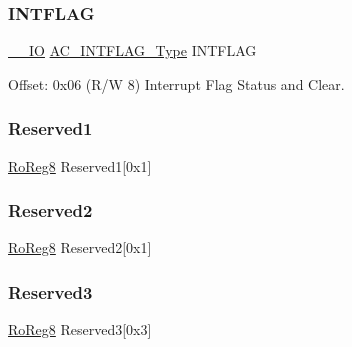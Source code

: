 \subsubsection{\texorpdfstring{INTFLAG}{INTFLAG}}
{\footnotesize\ttfamily \mbox{\hyperlink{core__cm0plus_8h_aec43007d9998a0a0e01faede4133d6be}{\+\_\+\+\_\+\+IO}} \mbox{\hyperlink{union_a_c___i_n_t_f_l_a_g___type}{A\+C\+\_\+\+I\+N\+T\+F\+L\+A\+G\+\_\+\+Type}} I\+N\+T\+F\+L\+AG}



Offset\+: 0x06 (R/W 8) Interrupt Flag Status and Clear. 

\mbox{\label{struct_ac_a092866123ac46d0985136e4dca2f36f4}} 
\subsubsection{\texorpdfstring{Reserved1}{Reserved1}}
{\footnotesize\ttfamily \mbox{\hyperlink{group___s_a_m_d21_e15_a__definitions_ga0d957f1433aaf5d70e4dc2b68288442d}{Ro\+Reg8}} Reserved1\mbox{[}0x1\mbox{]}}

\mbox{\label{struct_ac_a99ee50bfa44e107c16a546d778dcdcc7}} 
\subsubsection{\texorpdfstring{Reserved2}{Reserved2}}
{\footnotesize\ttfamily \mbox{\hyperlink{group___s_a_m_d21_e15_a__definitions_ga0d957f1433aaf5d70e4dc2b68288442d}{Ro\+Reg8}} Reserved2\mbox{[}0x1\mbox{]}}

\mbox{\label{struct_ac_ab22abf5c83fa4a01809facc55e0fda29}} 
\subsubsection{\texorpdfstring{Reserved3}{Reserved3}}
{\footnotesize\ttfamily \mbox{\hyperlink{group___s_a_m_d21_e15_a__definitions_ga0d957f1433aaf5d70e4dc2b68288442d}{Ro\+Reg8}} Reserved3\mbox{[}0x3\mbox{]}}

\mbox{\label{struct_ac_ab7b3e550ab30de0179365b0293537564}} 

